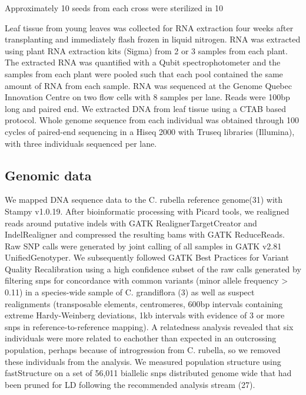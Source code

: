 Approximately 10 seeds from each cross were sterilized in 10%

Leaf tissue from young leaves was collected for RNA extraction four weeks after transplanting and immediately flash frozen in liquid nitrogen. RNA was extracted using plant RNA extraction kits (Sigma) from 2 or 3 samples from each plant. The extracted RNA was quantified with a Qubit spectrophotometer and the samples from each plant were pooled such that each pool contained the same amount of RNA from each sample. RNA was sequenced at the Genome Quebec Innovation Centre on two flow cells with 8 samples per lane. Reads were 100bp long and paired end. We extracted DNA from leaf tissue using a CTAB based protocol. Whole genome sequence from each individual was obtained through 100 cycles of paired-end sequencing in a Hiseq 2000 with Truseq libraries (Illumina), with three individuals sequenced per lane.

\subsection{Genomic data}
We mapped DNA sequence data to the C. rubella reference genome(31) with Stampy v1.0.19. After bioinformatic processing with Picard tools, we realigned reads around putative indels with GATK RealignerTargetCreator and IndelRealigner and compressed the resulting bams with GATK ReduceReads. Raw SNP calls were generated by joint calling of all samples in GATK v2.81 UnifiedGenotyper. We subsequently followed GATK Best Practices for Variant Quality Recalibration using a high confidence subset of the  raw calls generated by filtering snps for concordance with common variants (minor allele frequency > 0.11) in a species-wide sample of C. grandiflora (3) as well as suspect realignments (transposable elements, centromeres, 600bp intervals containing extreme Hardy-Weinberg deviations, 1kb intervals with evidence of 3 or more snps in reference-to-reference mapping). A relatedness analysis revealed that six individuals were more related to eachother than expected in an outcrossing population, perhaps because of introgression from C. rubella, so we removed these individuals from the analysis. We measured population structure using fastStructure on a set of 56,011 biallelic snps distributed genome wide that had been pruned for LD following the recommended analysis stream (27).

